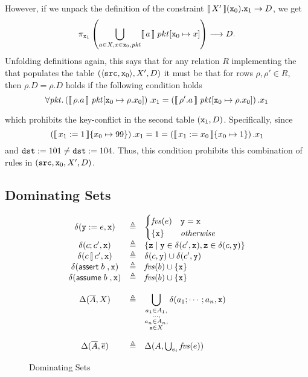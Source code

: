 However, if we unpack the definition of the constraint
$\llbracket\,X'\,\rrbracket(\texttt{x}_0).\texttt{x}_1 \to D$, we get
\[\pi_{\texttt{x}_1}\left(\bigcup_{a \in X, x \in
      \texttt{x}_0,\mathit{pkt}} \llbracket\,a\,\rrbracket\; pkt[\texttt{x}_0 \mapsto x]
  \right) \longrightarrow D.\] Unfolding definitions again, this says
that for any relation $R$ implementing the that populates the table
$(\langle\texttt{src},\texttt{x}_0\rangle, X', D)$ it must be that for
rows $\rho, \rho' \in R$, then $\rho.D = \rho.D$ holds if the
following condition holds
\[\forall \mathit{pkt}. \left(\llbracket\,\rho.a\,\rrbracket\; \mathit{pkt}[\texttt{x}_0 \mapsto
    \rho.x_0 ]\right).x_1 =
  \left(\llbracket\,\rho'.a\,\rrbracket\;\mathit{pkt}[\texttt{x}_0\mapsto \rho.x_0
    ]\right).x_1\]

which prohibits the key-conflict in the second table
$(\texttt{x}_1,D)$. Specifically, since
\[\left(\llbracket\,x_1:=1\,\rrbracket \{x_0 \mapsto 99\}\right).x_1 = 1 =
  \left(\llbracket\,x_1:=x_0\,\rrbracket \{x_0 \mapsto 1\}\right).x_1\] and
$\texttt{dst} := 101 \neq \texttt{dst} := 104$. Thus, this condition
prohibits this combination of rules in
$(\texttt{src}, \texttt{x}_0, X', D)$.


\subsection{Dominating Sets}

\begin{figure}[tpb]
  \[\begin{array}{c>{\triangleq}cl}
      \delta(\var y := e,\var x) && \begin{cases}
        \fvs(e) &\var y = \var x\\
        \{\var x\} & \textit{otherwise} \end{cases} \\
      \delta(c;c', \var x) && \left\{\var z \mid \var y \in \delta(c', \var x), \var z \in \delta(c, \var y)\right\} \\
      \delta(c\angel c', \var x) && \delta (c, \var y) \cup \delta(c', \var y) \\
      \delta(\assert b, \var x) && \fvs(b) \cup \{\var x\} \\
      \delta(\assume b, \var x) && \fvs(b) \cup \{\var x\} \\\\
      \Delta(\vec A, X) && \displaystyle\bigcup_{\substack{a_1\in A_1,\\\ldots,\\ a_n \in A_n, \\\var x \in X}}\delta(a_1;\cdots; a_n,\var x) \\\\
      \Delta(\vec A, \vec e) && \Delta(A, \bigcup_{e_i}\fvs(e))
    \end{array}\]
  \caption{Dominating Sets}
  \label{fig:dominating-sets }
\end{figure}


